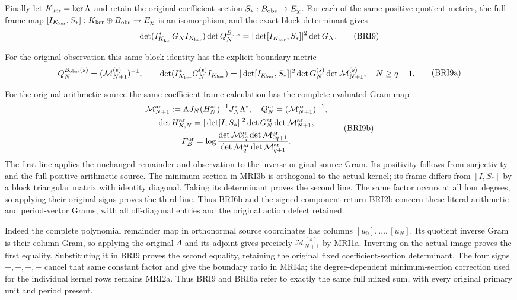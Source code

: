 \documentclass[11pt,a4paper]{article}
\begin{document}
Finally let $K_{\rm ker}=\ker\Lambda$ and retain the original
coefficient section $S_*:B_{\rm obs}\to E_\chi$.
For each of the same positive quotient metrics, the full frame map
$[I_{K_{\rm ker}},S_*]:K_{\rm ker}\oplus B_{\rm obs}\to E_\chi$
is an isomorphism, and the exact block determinant gives
\[
 \det(I_{K_{\rm ker}}^*G_NI_{K_{\rm ker}})\det Q_N^{B_{\rm obs}}
 =|\det[I_{K_{\rm ker}},S_*]|^2\det G_N.
 \tag{BRI9}
\]

For the original observation this same block identity has the
explicit boundary metric
\[
\begin{gathered}
 Q_N^{B_{\rm obs},(s)}=(\mathcal M_{N+1}^{(s)})^{-1},\qquad
 \det(I_{K_{\rm ker}}^*G_N^{(s)}I_{K_{\rm ker}})
 =|\det[I_{K_{\rm ker}},S_*]|^2\det G_N^{(s)}
                                  \det\mathcal M_{N+1}^{(s)},
 \quad N\ge q-1.
\end{gathered}\tag{BRI9a}
\]

For the original arithmetic source the same coefficient-frame
calculation has the complete evaluated Gram map
\[
\begin{gathered}
 \mathcal M_{N+1}^{\rm ar}:=
       \Lambda J_N(H_N^{\rm ar})^{-1}J_N^*\Lambda^*,\quad
 Q_N^{\rm ar}=(\mathcal M_{N+1}^{\rm ar})^{-1},\\
 \det H_{K,N}^{\rm ar}
 =|\det[I,S_*]|^2\det G_N^{\rm ar}
                                    \det\mathcal M_{N+1}^{\rm ar},\\
 F_B^{\rm ar}=\log\frac{
 \det\mathcal M_{2q}^{\rm ar}\det\mathcal M_{2q+1}^{\rm ar}}
 {\det\mathcal M_q^{\rm ar}\det\mathcal M_{q+1}^{\rm ar}}.
\end{gathered}\tag{BRI9b}
\]
The first line applies the unchanged remainder and observation
to the inverse original source Gram. Its positivity follows
from surjectivity and the full positive arithmetic source.
The minimum section in MRI3b is orthogonal to the actual
kernel; its frame differs from $[I,S_*]$ by a block triangular
matrix with identity diagonal. Taking its determinant proves
the second line. The same factor occurs at all four degrees,
so applying their original signs proves the third line.
Thus BRI6b and the signed component return BRI2b concern
these literal arithmetic and period-vector Grams, with all
off-diagonal entries and the original action defect retained.

Indeed the complete polynomial remainder map in orthonormal
source coordinates has columns $[u_0],\ldots,[u_N]$.
Its quotient inverse Gram is their column Gram, so applying
the original $\Lambda$ and its adjoint gives precisely
$\mathcal M_{N+1}^{(s)}$ by MRI1a. Inverting on the actual
image proves the first equality. Substituting it in BRI9
proves the second equality, retaining the original fixed
coefficient-section determinant. The four signs
$+,+,-,-$ cancel that same constant factor and give the
boundary ratio in MRI4a; the degree-dependent minimum-section
correction used for the individual kernel rows remains MRI2a.
Thus BRI9 and BRI6a refer to exactly the same full mixed sum,
with every original primary unit and period present.
\end{document}
